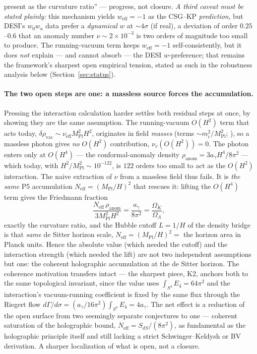 \documentclass[11pt,a4paper]{article}
\theoremstyle{plain}
\theoremstyle{definition}
\theoremstyle{remark}
\newcommand{\Ok}{\Omega_K}
\newcommand{\OL}{\Omega_\Lambda}
\newcommand{\ag}{a_\gamma}
\newcommand{\Mpl}{M_{\mathrm{Pl}}}
\begin{document}
present as the curvature ratio'' --- progress, not closure. \emph{A third caveat must be stated
plainly:} this mechanism yields $w_{\mathrm{eff}}=-1$ as the CSG--KP \emph{prediction}, but DESI's
$w_0w_a$ data prefer a \emph{dynamical} $w$ at ${\sim}4\sigma$ (if real), a deviation of order
$0.25$--$0.6$ that an anomaly number $\nu\sim2\times10^{-3}$ is two orders of magnitude too small to
produce. The running-vacuum term keeps $w_{\mathrm{eff}}=-1$ self-consistently, but it does
\emph{not} explain --- and cannot absorb --- the DESI $w$-preference; that remains the framework's
sharpest open empirical tension, stated as such in the robustness analysis below
(Section~\ref{sec:status}).

\paragraph{The two open steps are one: a massless source forces the accumulation.}
Pressing the interaction calculation harder settles both residual steps at once, by
showing they are the same assumption. The running-vacuum $O(H^2)$ term that acts today,
$\delta\rho_{\mathrm{vac}}\sim\nu_{\mathrm{eff}}\Mpl^2H^2$, originates in field
\emph{masses} (terms $\sim m_i^2/\Mpl^2$; \cite{SolaPeracaula2021}), so a massless photon
gives \emph{no} $O(H^2)$ contribution, $\nu_v(O(H^2))=0$. The photon enters only at
$O(H^4)$ --- the conformal-anomaly density $\rho_{\mathrm{anom}}=3\ag H^4/8\pi^2$ ---
which today, with $H^2/\Mpl^2\sim10^{-122}$, is $122$ orders too small to act as the
$O(H^2)$ interaction. The naive extraction of $\nu$ from a massless field thus fails. It is
\emph{the same} P5 accumulation $N_{\mathrm{eff}}=(\Mpl/H)^2$ that rescues it: lifting the
$O(H^4)$ term gives the Friedmann fraction
\begin{equation}
\frac{N_{\mathrm{eff}}\,\rho_{\mathrm{anom}}}{3\Mpl^2H^2} = \frac{\ag}{8\pi^2} = \frac{\Ok}{\OL},
\end{equation}
exactly the curvature ratio, and the Hubble cutoff $L=1/H$ of the density bridge is that
\emph{same} de Sitter horizon scale, $N_{\mathrm{eff}}=(\Mpl/H)^2=$ the horizon area in
Planck units. Hence the absolute value (which needed the cutoff) and the interaction
strength (which needed the lift) are not two independent assumptions but one: the coherent
holographic accumulation at the de Sitter horizon. The coherence motivation transfers
intact --- the sharpest piece, K2, anchors both to the same topological invariant, since the
value uses $\int_{S^4}E_4=64\pi^2$ and the interaction's vacuum-running coefficient is fixed
by the same flux through the Riegert flow $d\Gamma/d\sigma=(\ag/16\pi^2)\int_{S^4}E_4=4\ag$.
The net effect is a reduction of the open surface from two seemingly separate conjectures to
one --- coherent saturation of the holographic bound, $N_{\mathrm{eff}}=S_{dS}/(8\pi^2)$,
as fundamental as the holographic principle itself and still lacking a strict
Schwinger--Keldysh or BV derivation. A sharper localization of what is open, not a closure.
\end{document}
